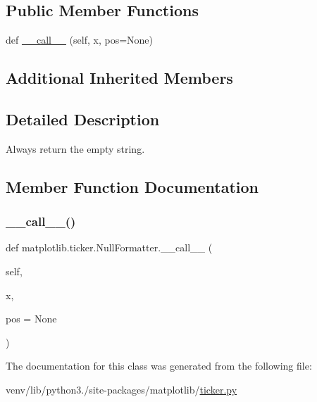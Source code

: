 \subsection*{Public Member Functions}
\begin{DoxyCompactItemize}
\item 
def \hyperlink{classmatplotlib_1_1ticker_1_1NullFormatter_a3d883e6ff4f2d350882013a00908ab9f}{\+\_\+\+\_\+call\+\_\+\+\_\+} (self, x, pos=None)
\end{DoxyCompactItemize}
\subsection*{Additional Inherited Members}


\subsection{Detailed Description}
\begin{DoxyVerb}Always return the empty string.\end{DoxyVerb}
 

\subsection{Member Function Documentation}
\mbox{\label{classmatplotlib_1_1ticker_1_1NullFormatter_a3d883e6ff4f2d350882013a00908ab9f}} 
\subsubsection{\texorpdfstring{\+\_\+\+\_\+call\+\_\+\+\_\+()}{\_\_call\_\_()}}
{\footnotesize\ttfamily def matplotlib.\+ticker.\+Null\+Formatter.\+\_\+\+\_\+call\+\_\+\+\_\+ (\begin{DoxyParamCaption}\item[{}]{self,  }\item[{}]{x,  }\item[{}]{pos = {\ttfamily None} }\end{DoxyParamCaption})}



The documentation for this class was generated from the following file\+:\begin{DoxyCompactItemize}
\item 
venv/lib/python3./site-\/packages/matplotlib/\hyperlink{ticker_8py}{ticker.\+py}\end{DoxyCompactItemize}
